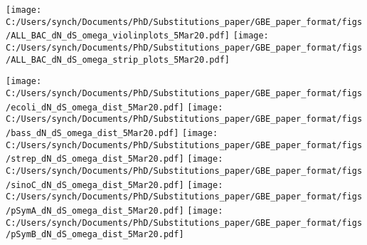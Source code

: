\documentclass[12pt]{article}
\begin{document}
\newpage

\texttt{[image: C:/Users/synch/Documents/PhD/Substitutions\_paper/GBE\_paper\_format/figs/ALL\_BAC\_dN\_dS\_omega\_violinplots\_5Mar20.pdf]}
\texttt{[image: C:/Users/synch/Documents/PhD/Substitutions\_paper/GBE\_paper\_format/figs/ALL\_BAC\_dN\_dS\_omega\_strip\_plots\_5Mar20.pdf]}

\texttt{[image: C:/Users/synch/Documents/PhD/Substitutions\_paper/GBE\_paper\_format/figs/ecoli\_dN\_dS\_omega\_dist\_5Mar20.pdf]}
\texttt{[image: C:/Users/synch/Documents/PhD/Substitutions\_paper/GBE\_paper\_format/figs/bass\_dN\_dS\_omega\_dist\_5Mar20.pdf]}
\texttt{[image: C:/Users/synch/Documents/PhD/Substitutions\_paper/GBE\_paper\_format/figs/strep\_dN\_dS\_omega\_dist\_5Mar20.pdf]}
\texttt{[image: C:/Users/synch/Documents/PhD/Substitutions\_paper/GBE\_paper\_format/figs/sinoC\_dN\_dS\_omega\_dist\_5Mar20.pdf]}
\texttt{[image: C:/Users/synch/Documents/PhD/Substitutions\_paper/GBE\_paper\_format/figs/pSymA\_dN\_dS\_omega\_dist\_5Mar20.pdf]}
\texttt{[image: C:/Users/synch/Documents/PhD/Substitutions\_paper/GBE\_paper\_format/figs/pSymB\_dN\_dS\_omega\_dist\_5Mar20.pdf]}

\end{document}
